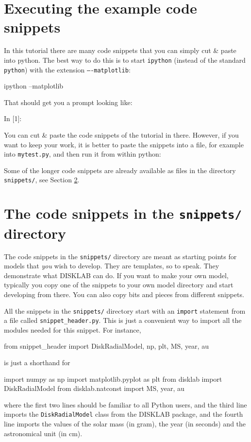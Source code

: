 \documentclass{book}
\newcommand{\code}[1]{{\small\tt #1}}
\begin{document}
\section{Executing the example code snippets}
In this tutorial there are many code snippets that you can simply cut \& paste
into python. The best way to do this is to start \code{ipython} (instead of
the standard \code{python}) with the extension \code{----matplotlib}:
\begin{codebox}
ipython --matplotlib
\end{codebox}
That should get you a prompt looking like:
\begin{codebox}
In [1]:
\end{codebox}
You can cut \& paste the code snippets of the tutorial in there. However,
if you want to keep your work, it is better to paste the snippets into
a file, for example into \code{mytest.py}, and then run it from within
python:
\begin{codebox}
\end{codebox}
Some of the longer code snippets are already available as files in
the directory \code{snippets/}, see Section \ref{sec-code-snippets}.

\section{The code snippets in the {\tt snippets/} directory}
\label{sec-code-snippets}
%
The code snippets in the \code{snippets/} directory are meant as starting
points for models that {\em you} wish to develop. They are templates, so to
speak. They demonstrate what {\sf DISKLAB} can do. If you want to make your
own model, typically you copy one of the snippets to your own model
directory and start developing from there. You can also copy bits and pieces
from different snippets.

All the snippets in the \code{snippets/} directory start with an \code{import}
statement from a file called \code{snippet\_header.py}. This is just a
convenient way to import all the modules needed for this snippet. For instance,
\begin{codebox}
from snippet_header import DiskRadialModel, np, plt, MS, year, au
\end{codebox}
is just a shorthand for
\begin{codebox}
import numpy as np
import matplotlib.pyplot as plt
from disklab import DiskRadialModel
from disklab.natconst import MS, year, au
\end{codebox}
where the first two lines should be familiar to all Python users, and the third
line imports the \code{DiskRadialModel} class from the {\sf DISKLAB} package, and the
fourth line imports the values of the solar mass (in gram), the year (in seconds)
and the astronomical unit (in cm).
\end{document}
